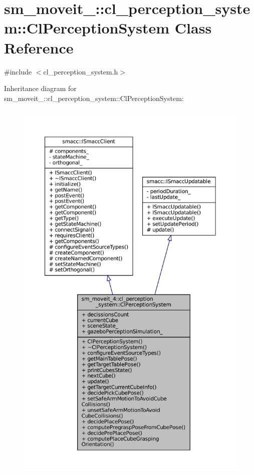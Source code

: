 \hypertarget{classsm__moveit__4_1_1cl__perception__system_1_1ClPerceptionSystem}{}\section{sm\+\_\+moveit\+\_\+:\+:cl\+\_\+perception\+\_\+system\+:\+:Cl\+Perception\+System Class Reference}
\label{classsm__moveit__4_1_1cl__perception__system_1_1ClPerceptionSystem}


{\ttfamily \#include $<$cl\+\_\+perception\+\_\+system.\+h$>$}



Inheritance diagram for sm\+\_\+moveit\+\_\+:\+:cl\+\_\+perception\+\_\+system\+:\+:Cl\+Perception\+System\+:
\nopagebreak
\begin{figure}[H]
\begin{center}
\leavevmode
\includegraphics[height=550pt]{classsm__moveit__4_1_1cl__perception__system_1_1ClPerceptionSystem__inherit__graph}
\end{center}
\end{figure}


